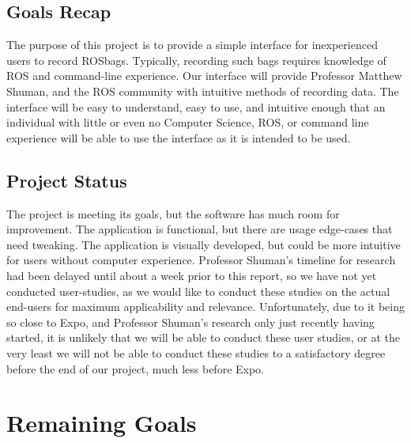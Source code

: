 \documentclass[onecolumn, draftclsnofoot,10pt, compsoc]{IEEEtran}
\begin{document}
\subsection{Goals Recap}
The purpose of this project is to provide a simple interface for inexperienced users to record ROSbags. Typically, recording such bags requires knowledge of ROS and command-line experience. Our interface will provide Professor Matthew Shuman, and the ROS community with intuitive methods of recording data. The interface will be easy to understand, easy to use, and intuitive enough that an individual with little or even no Computer Science, ROS, or command line experience will be able to use the interface as it is intended to be used.

\subsection{Project Status}
The project is meeting its goals, but the software has much room for improvement. The application is functional, but there are usage edge-cases that need tweaking. The application is visually developed, but could be more intuitive for users without computer experience. Professor Shuman’s timeline for research had been delayed until about a week prior to this report, so we have not yet conducted user-studies, as we would like to conduct these studies on the actual end-users for maximum applicability and relevance. Unfortunately, due to it being so close to Expo, and Professor Shuman's research only just recently having started, it is unlikely that we will be able to conduct these user studies, or at the very least we will not be able to conduct these studies to a satisfactory degree before the end of our project, much less before Expo.

\section{Remaining Goals}
\end{document}
